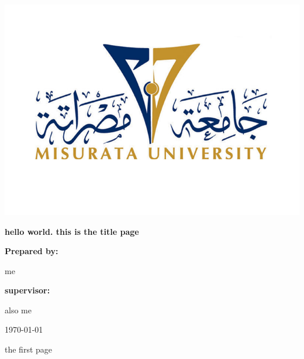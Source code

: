 \documentclass[10pt]{article}
\begin{document}
\begin{titlepage}
    \begin{center}
        \includegraphics{images/logo2.png}
        \vspace{0.5in}

        {\huge \textbf{hello world. this is the title page}}

        \vspace{0.5in}

        \textbf{Prepared by:}

        me

        \vspace{0.5in}
        \textbf{supervisor:}

        also me

        \vspace{0.5in}
        \today
    \end{center}
\end{titlepage}

the first page
\end{document}

